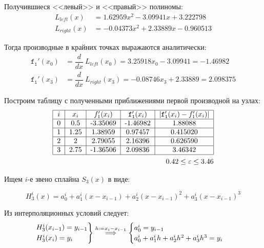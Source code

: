 Получившиеся <<левый>> и <<правый>> полиномы:
\begin{align}
    L_{left}(x)  &= 1.62959x^2 - 3.09941x + 3.222798\\
    L_{right}(x) &=-0.04373x^2 + 2.33889x - 0.960513
\end{align}

Тогда производные в крайних точках выражаются аналитически:
\begin{align}
    \mathtt{f_1'}(x_0) &= \dfrac{d}{dx} ~ L_{left}(x_0) = 3.25918x_0 - 3.09941 = -1.46982\\
    \mathtt{f_1'}(x_3) &= \dfrac{d}{dx} ~ L_{right}(x_3)= -0.08746x_3 + 2.33889 = 2.098375
\end{align}

Построим таблицу с полученными приближениями первой производной на узлах:
\begin{align}
    \begin{tabular}{|c|c|c|c|c|}
        \hline
        $i$ & $x_i$ & $f_1'(x_i)$ & $\mathtt{f_1'}(x_i)$ & $|\mathtt{f_1'}(x_i)-f_1'(x_i)|$ \\
        \hline
        0 & 0.5 & -3.35069 & -1.46982 & 1.88088\\
        \hline
        1 &  1.25 & 1.38959 & 0.97457 &0.415020\\
        \hline
        2 &  2 &  2.79055 & 2.16396 &0.626590\\
        \hline
        3 &  2.75 & -1.36506 & 2.09836 &3.46342\\
        \hline
    \end{tabular}\\
    0.42 \le \varepsilon \le 3.46
\end{align}

Ищем $i$-е звено сплайна $S_3(x)$ в виде:

\begin{equation}
    H_3^i(x) = a_0^i + a_1^i(x-x_{i-1}) + a_2^i(x-x_{i-1})^2 + a_3^i(x-x_{i-1})^3
\end{equation}

Из интерполяционных условий следует:
\begin{equation}
    \begin{rcases}
        H_3^i(x_{i-1}) = y_{i-1} \\
        H_3^i(x_i) = y_i
    \end{rcases} \overset{h:=x_i-x_{i-1}}{\implies}
    \begin{cases}
        a_0^i = y_{i-1} \\
        a_0^i + a_1^ih + a_2^ih^2 + a_3^ih^3 = y_i
    \end{cases}
\end{equation}


